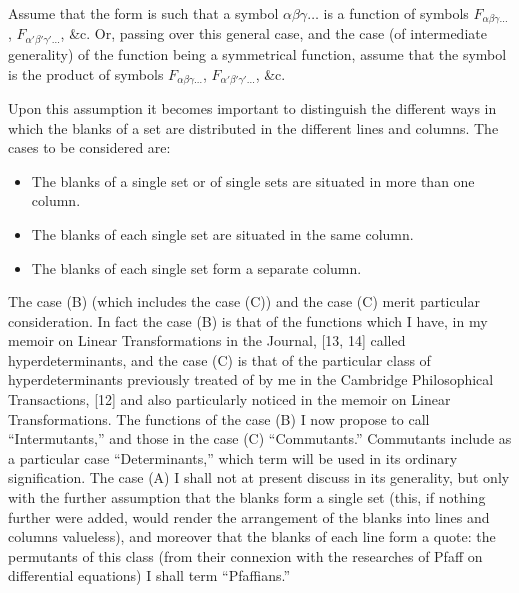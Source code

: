 \documentclass[11pt,a4paper]{article}
\theoremstyle{plain}
\begin{document}
Assume that the form is such that a symbol $\alpha\beta\gamma\ldots$ is a function of symbols $F_{\alpha\beta\gamma\ldots}$, $F_{\alpha'\beta'\gamma'\ldots}$, \&c. Or, passing over this general case, and the case (of intermediate generality) of the function being a symmetrical function, assume that the symbol is the product of symbols $F_{\alpha\beta\gamma\ldots}$, $F_{\alpha'\beta'\gamma'\ldots}$, \&c.

Upon this assumption it becomes important to distinguish the different ways in which the blanks of a set are distributed in the different lines and columns. The cases to be considered are:
\begin{itemize}
\item[(A).] The blanks of a single set or of single sets are situated in more than one column.
\item[(B).] The blanks of each single set are situated in the same column.
\item[(C).] The blanks of each single set form a separate column.
\end{itemize}

The case (B) (which includes the case (C)) and the case (C) merit particular consideration. In fact the case (B) is that of the functions which I have, in my memoir on Linear Transformations in the Journal, [13, 14] called hyperdeterminants, and the case (C) is that of the particular class of hyperdeterminants previously treated of by me in the Cambridge Philosophical Transactions, [12] and also particularly noticed in the memoir on Linear Transformations. The functions of the case (B) I now propose to call ``Intermutants,'' and those in the case (C) ``Commutants.'' Commutants include as a particular case ``Determinants,'' which term will be used in its ordinary signification. The case (A) I shall not at present discuss in its generality, but only with the further assumption that the blanks form a single set (this, if nothing further were added, would render the arrangement of the blanks into lines and columns valueless), and moreover that the blanks of each line form a quote: the permutants of this class (from their connexion with the researches of Pfaff on differential equations) I shall term ``Pfaffians.''
\end{document}
